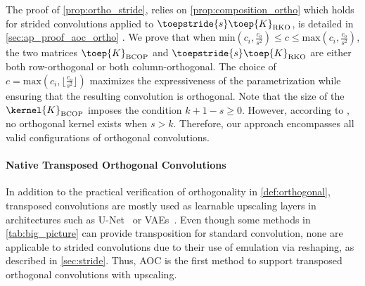     The proof of \cref{prop:ortho_stride},  relies on  \cref{prop:composition_ortho} which holds for strided convolutions applied to $\toepstride{s} \toep{K}_{\text{RKO}}$, is detailed in \cref{sec:ap_proof_aoc_ortho} .
    We prove that when $\text{min}(c_i, \frac{c_o}{s^2})\leq c \leq \text{max}(c_i, \frac{c_o}{s^2})$, the two matrices $\toep{K}_{\text{BCOP}}$ and $\toepstride{s} \toep{K}_{\text{RKO}}$ are either both row-orthogonal or both column-orthogonal. The choice of $c = \text{max}(c_i, \lfloor\frac{c_o}{s^2}\rfloor)$ maximizes the expressiveness of the parametrization while ensuring that the resulting convolution is orthogonal. 
    Note that the size of the $\kernel{K}_{\text{BCOP}}$ imposes the condition $k+1-s \geq 0$. However, according to \cite{achour2023existencestabilityscalabilityorthogonal}, no orthogonal kernel exists when $s > k$. Therefore, our approach encompasses all valid configurations of orthogonal convolutions.


    
\paragraph{Native Transposed Orthogonal Convolutions}\label{sec:transpose}

    In addition to the practical verification of orthogonality in  \cref{def:orthogonal}, transposed convolutions are mostly used as learnable upscaling layers in architectures such as U-Net~\cite{ronneberger2015u} or VAEs~\cite{kingma2013auto,van2017neural}. Even though some methods in \cref{tab:big_picture} can provide transposition for standard convolution, none are applicable to strided convolutions due to their use of emulation via reshaping, as described in \cref{sec:stride}. Thus, AOC is the first method to support transposed orthogonal convolutions with upscaling.
    
